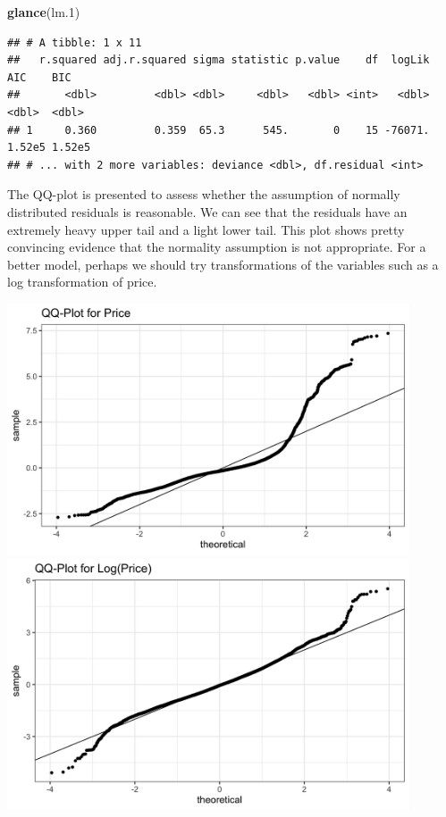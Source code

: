 \documentclass[]{article}
\newenvironment{Shaded}{\begin{snugshade}}{\end{snugshade}}
\newcommand{\FloatTok}[1]{\textcolor[rgb]{0.00,0.00,0.81}{#1}}
\newcommand{\KeywordTok}[1]{\textcolor[rgb]{0.13,0.29,0.53}{\textbf{#1}}}
\newcommand{\NormalTok}[1]{#1}
\begin{document}
\begin{Shaded}
\begin{Highlighting}[]
\KeywordTok{glance}\NormalTok{(lm}\FloatTok{.1}\NormalTok{)}
\end{Highlighting}
\end{Shaded}

\begin{verbatim}
## # A tibble: 1 x 11
##   r.squared adj.r.squared sigma statistic p.value    df  logLik    AIC    BIC
##       <dbl>         <dbl> <dbl>     <dbl>   <dbl> <int>   <dbl>  <dbl>  <dbl>
## 1     0.360         0.359  65.3      545.       0    15 -76071. 1.52e5 1.52e5
## # ... with 2 more variables: deviance <dbl>, df.residual <int>
\end{verbatim}

The QQ-plot is presented to assess whether the assumption of normally
distributed residuals is reasonable. We can see that the residuals have
an extremely heavy upper tail and a light lower tail. This plot shows
pretty convincing evidence that the normality assumption is not
appropriate. For a better model, perhaps we should try transformations
of the variables such as a log transformation of price.

\includegraphics[width=4.6875in,height=\textheight]{../images/lm1-QQPlot.png}
\includegraphics[width=4.6875in,height=\textheight]{../images/lm2-QQPlot.png}
\end{document}
